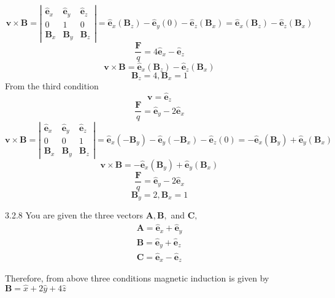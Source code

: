$$
\mathbf{v} \times \mathbf{B}=\left|\begin{array}{ccc}
\hat{\mathbf{e}}_{x} & \hat{\mathbf{e}}_{y} & \hat{\mathbf{e}}_{z} \\
0 & 1 & 0 \\
\mathbf{B}_{x} & \mathbf{B}_{y} & \mathbf{B}_{z}
\end{array}\right|=\hat{\mathbf{e}}_{x}\left(\mathbf{B}_{z}\right)-\hat{\mathbf{e}}_{y}(0)-\hat{\mathbf{e}}_{z}\left(\mathbf{B}_{x}\right)=\hat{\mathbf{e}}_{x}\left(\mathbf{B}_{z}\right)-\hat{\mathbf{e}}_{z}\left(\mathbf{B}_{x}\right)
$$
$$\frac{\mathbf{F}}{q}=4 \hat{\mathbf{e}}_{x}-\hat{\mathbf{e}}_{z}$$
$$ \mathbf{v} \times \mathbf{B}=\hat{\mathbf{e}}_{x}\left(\mathbf{B}_{z}\right)-\hat{\mathbf{e}}_{z}\left(\mathbf{B}_{x}\right)$$
$$\mathbf{B}_{z}=4, \mathbf{B}_{x}=1$$
From the third condition 
$$
\mathbf{v}=\hat{\mathbf{e}}_{z}$$
$$ \frac{\mathbf{F}}{q}=\hat{\mathbf{e}}_{y}-2 \hat{\mathbf{e}}_{x}
$$
$$
\mathbf{v} \times \mathbf{B}=\left|\begin{array}{ccc}
\hat{\mathbf{e}}_{x} & \hat{\mathbf{e}}_{y} & \hat{\mathbf{e}}_{z} \\
0 & 0 & 1 \\
\mathbf{B}_{x} & \mathbf{B}_{y} & \mathbf{B}_{z}
\end{array}\right|=\hat{\mathbf{e}}_{x}\left(-\mathbf{B}_{y}\right)-\hat{\mathbf{e}}_{y}\left(-\mathbf{B}_{x}\right)-\hat{\mathbf{e}}_{z}(0)=-\hat{\mathbf{e}}_{x}\left(\mathbf{B}_{y}\right)+\hat{\mathbf{e}}_{y}\left(\mathbf{B}_{x}\right)
$$
$$\mathbf{v} \times \mathbf{B}=-\hat{\mathbf{e}}_{x}\left(\mathbf{B}_{y}\right)+\hat{\mathbf{e}}_{y}\left(\mathbf{B}_{x}\right)$$
$$ \frac{\mathbf{F}}{q}=\hat{\mathbf{e}}_{y}-2 \hat{\mathbf{e}}_{x}$$
$$\mathbf{B}_{y}=2, \mathbf{B}_{x}=1$$

\newpage


\begin{mybox}{3.2.8}
You are given the three vectors $\mathbf{A}, \mathbf{B},$ and $\mathbf{C},$
$$
\begin{array}{l}{\mathbf{A}=\hat{\mathbf{e}}_{x}+\hat{\mathbf{e}}_{y}} \\ {\mathbf{B}=\hat{\mathbf{e}}_{y}+\hat{\mathbf{e}}_{z}} \\ {\mathbf{C}=\hat{\mathbf{e}}_{x}-\hat{\mathbf{e}}_{z}}\end{array}
$$

Therefore, from above three conditions magnetic induction is given by $ \mathbf{B} = \hat { x } + 2 \hat { y } + 4 \hat { z }$
\end{mybox}


